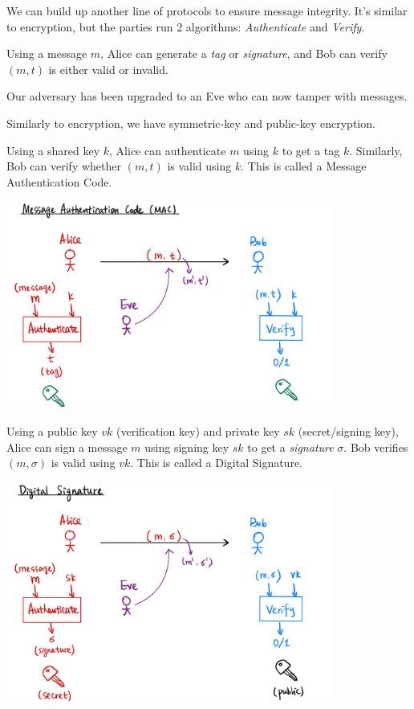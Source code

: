 We can build up another line of protocols to ensure message integrity. It's similar to encryption, but the parties run 2 algorithms: \emph{Authenticate} and \emph{Verify}.

Using a message $m$, Alice can generate a \emph{tag} or \emph{signature}, and Bob can verify $(m, t)$ is either valid or invalid.

Our adversary has been upgraded to an Eve who can now tamper with messages.

Similarly to encryption, we have symmetric-key and public-key encryption.

Using a shared key $k$, Alice can authenticate $m$ using $k$ to get a tag $k$. Similarly, Bob can verify whether $(m, t)$ is valid using $k$. This is called a Message Authentication Code.

\begin{center}
    \includegraphics[width=0.8\textwidth]{images/2023-02-02/mac.png}
\end{center}

Using a public key $vk$ (verification key) and private key $sk$ (secret/signing key), Alice can sign a message $m$ using signing key $sk$ to get a \emph{signature} $\sigma$. Bob verifies $(m, \sigma)$ is valid using $vk$. This is called a Digital Signature.

\begin{center}
    \includegraphics[width=0.8\textwidth]{images/2023-02-02/signature.png}
\end{center}

